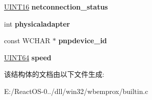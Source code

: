 \begin{DoxyCompactItemize}
\hyperlink{_processor_bind_8h_a09f1a1fb2293e33483cc8d44aefb1eb1}{U\+I\+N\+T16} {\bfseries netconnection\+\_\+status}
\item 
\mbox{\label{structrecord__networkadapter_a48d456b3631df170c411aeb6c7241536}} 
int {\bfseries physicaladapter}
\item 
\mbox{\label{structrecord__networkadapter_abfb2f3981fb8f565a2203d8aefa1c78c}} 
const W\+C\+H\+AR $\ast$ {\bfseries pnpdevice\+\_\+id}
\item 
\mbox{\label{structrecord__networkadapter_aaaaaeb8b27858c2e83205c8054a8b150}} 
\hyperlink{_processor_bind_8h_a57be03562867144161c1bfee95ca8f7c}{U\+I\+N\+T64} {\bfseries speed}
\end{DoxyCompactItemize}


该结构体的文档由以下文件生成\+:\begin{DoxyCompactItemize}
\item 
E\+:/\+React\+O\+S-\/0../dll/win32/wbemprox/builtin.\+c\end{DoxyCompactItemize}
